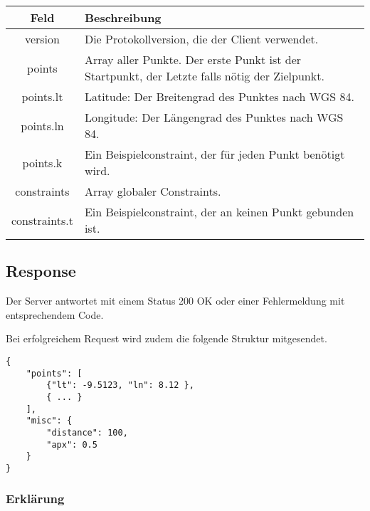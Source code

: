 \documentclass[ngerman,titlepage]{scrartcl}
\begin{document}
	    \noindent \begin{tabular}{|c|p{12cm}|}
	    	\hline
	    	\textbf{Feld} & \textbf{Beschreibung} \\ 
	    	\hline \hline
	    	
	    	version & Die Protokollversion, die der Client verwendet.\\
	    	\hline
	    	
	    	points & Array aller Punkte. Der erste Punkt ist der Startpunkt, der Letzte falls nötig der Zielpunkt. \\ 
	    	\hline
	    	
	    	points.lt & Latitude: Der Breitengrad des Punktes nach WGS 84. \\ 
	    	\hline
	    	
	    	points.ln & Longitude: Der Längengrad des Punktes nach WGS 84. \\
	    	\hline
	    	
	    	points.k & Ein Beispielconstraint, der für jeden Punkt benötigt wird.\\ 
	    	\hline
	    	
	    	constraints & Array globaler Constraints.\\ 
	    	\hline
	    	
	    	constraints.t & Ein Beispielconstraint, der an keinen Punkt gebunden ist.\\ 
	    	\hline
	    \end{tabular}
    
	\subsection*{Response}
	
	Der Server antwortet mit einem Status 200 OK oder einer Fehlermeldung mit entsprechendem Code.
	
	Bei erfolgreichem Request wird zudem die folgende Struktur mitgesendet.
	
	\begin{lstlisting}
{
	"points": [
		{"lt": -9.5123, "ln": 8.12 },
		{ ... }
	],
	"misc": {
		"distance": 100,
		"apx": 0.5
	}
}
	\end{lstlisting}
	
		\subsubsection*{Erklärung}
		
\end{document}
